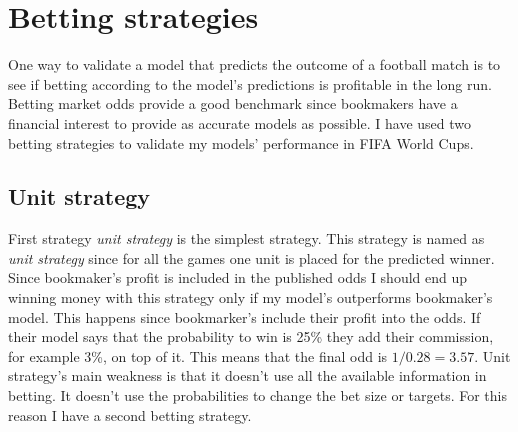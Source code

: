 \section{Betting strategies}
One way to validate a model that predicts the outcome of a football match is to see if betting according to the model's predictions is profitable in the long run. Betting market odds provide a good benchmark since bookmakers have a financial interest to provide as accurate models as possible. I have used two betting strategies to validate my models' performance in FIFA World Cups.

\subsection{Unit strategy}
First strategy \textit{unit strategy} is the simplest strategy. This strategy is named as \textit{unit strategy} since for all the games one unit is placed for the predicted winner. Since bookmaker's profit is included in the published odds I should end up winning money with this strategy only if my model's outperforms bookmaker's model. This happens since bookmarker's include their profit into the odds. If their model says that the probability to win is 25\% they add their commission, for example 3\%, on top of it. This means that the final odd is $1/0.28 = 3.57$. Unit strategy's main weakness is that it doesn't use all the available information in betting. It doesn't use the probabilities to change the bet size or targets. For this reason I have a second betting strategy.

